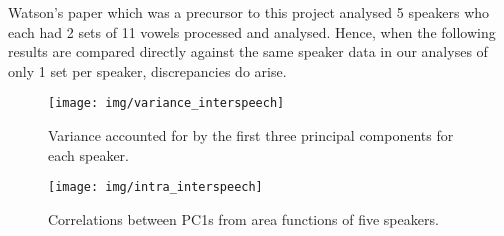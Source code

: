 Watson's paper \cite{watson2014mappings} which was a precursor to this project analysed 5 speakers who each had 2 sets of 11 vowels processed and analysed. Hence, when the following results are compared directly against the same speaker data in our analyses of only 1 set per speaker, discrepancies do arise.

\begin{figure}[H]
    \centering
    \texttt{[image: img/variance\_interspeech]}
    \caption{Variance accounted for by the first three principal components for each speaker.}
    \label{fig:variance_interspeech}
\end{figure}

\begin{figure}[H]
    \centering
    \texttt{[image: img/intra\_interspeech]}
    \caption{Correlations between PC1s from area functions of five speakers.}
    \label{fig:intra_interspeech}
\end{figure}